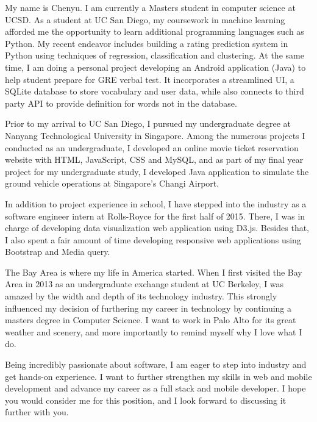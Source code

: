 \documentclass[11pt, a4paper]{awesome-cv}
\begin{document}
\makecvheader

\makelettertitle

\begin{cvletter}
My name is Chenyu. I am currently a Masters student in computer science at UCSD. As a student at UC San Diego, my coursework in machine learning afforded me the opportunity to learn additional programming languages such as Python. My recent endeavor includes building a rating prediction system in Python using techniques of regression, classification and clustering. At the same time, I am doing a personal project developing an Android application (Java) to help student prepare for GRE verbal test. It incorporates a streamlined UI, a SQLite database to store vocabulary and user data, while also connects to third party API to provide definition for words not in the database. 

Prior to my arrival to UC San Diego, I pursued my undergraduate degree at Nanyang Technological University in Singapore. Among the numerous projects I conducted as an undergraduate, I developed an online movie ticket reservation website with HTML, JavaScript, CSS and MySQL, and as part of my final year project for my undergraduate study, I developed Java application to simulate the ground vehicle operations at Singapore’s Changi Airport.

In addition to project experience in school, I have stepped into the industry as a software engineer intern at Rolls-Royce for the first half of 2015. There, I was in charge of developing data visualization web application using D3.js. Besides that, I also spent a fair amount of time developing responsive web applications using Bootstrap and Media query.

The Bay Area is where my life in America started. When I first visited the Bay Area in 2013 as an undergraduate exchange student at UC Berkeley, I was amazed by the width and depth of its technology industry. This strongly influenced my decision of furthering my career in technology by continuing a masters degree in Computer Science. I want to work in Palo Alto for its great weather and scenery, and more importantly to remind myself why I love what I do.   

Being incredibly passionate about software, I am eager to step into industry and get hands-on experience. I want to further strengthen my skills in web and mobile development and advance my career as a full stack and mobile developer. I hope you would consider me for this position, and I look forward to discussing it further with you. 
\end{cvletter}

\makeletterclosing
\end{document}
